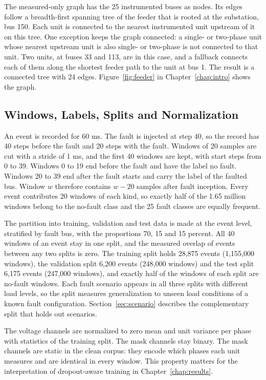 \documentclass[MTech]{ugthesis}
\begin{document}
The measured-only graph has the 25 instrumented buses as nodes. Its edges follow a breadth-first spanning tree of the feeder that is rooted at the substation, bus 150. Each unit is connected to the nearest instrumented unit upstream of it on this tree. One exception keeps the graph connected: a single- or two-phase unit whose nearest upstream unit is also single- or two-phase is not connected to that unit. Two units, at buses 33 and 113, are in this case, and a fallback connects each of them along the shortest feeder path to the unit at bus 1. The result is a connected tree with 24 edges. Figure~\ref{fig:feeder} in Chapter~\ref{chap:intro} shows the graph.

\subsection{Windows, Labels, Splits and Normalization}

An event is recorded for 60 ms. The fault is injected at step 40, so the record has 40 steps before the fault and 20 steps with the fault. Windows of 20 samples are cut with a stride of 1 ms, and the first 40 windows are kept, with start steps from 0 to 39. Windows 0 to 19 end before the fault and have the label no fault. Windows 20 to 39 end after the fault starts and carry the label of the faulted bus. Window $w$ therefore contains $w-20$ samples after fault inception. Every event contributes 20 windows of each kind, so exactly half of the 1.65 million windows belong to the no-fault class and the 25 fault classes are equally frequent.

The partition into training, validation and test data is made at the event level, stratified by fault bus, with the proportions 70, 15 and 15 percent. All 40 windows of an event stay in one split, and the measured overlap of events between any two splits is zero. The training split holds 28,875 events (1,155,000 windows), the validation split 6,200 events (248,000 windows) and the test split 6,175 events (247,000 windows), and exactly half of the windows of each split are no-fault windows. Each fault scenario appears in all three splits with different load levels, so the split measures generalization to unseen load conditions of a known fault configuration. Section~\ref{sec:scenario} describes the complementary split that holds out scenarios.


The voltage channels are normalized to zero mean and unit variance per phase with statistics of the training split. The mask channels stay binary. The mask channels are static in the clean corpus: they encode which phases each unit measures and are identical in every window. This property matters for the interpretation of dropout-aware training in Chapter~\ref{chap:results}.
\end{document}
